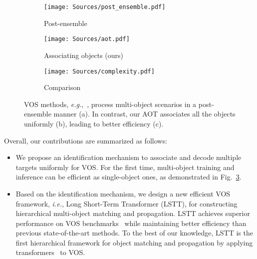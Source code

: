 \documentclass{article}
\def\eg{\emph{e.g.}}
\def\ie{\emph{i.e.}}
\begin{document}
\begin{figure}[t!]
\begin{center}

\begin{subfigure}[b]{.4\textwidth}
			\centering
			\texttt{[image: Sources/post\_ensemble.pdf]}
			\caption{Post-ensemble}\label{fig:post_ensemble}
\end{subfigure}
\begin{subfigure}[b]{.3\textwidth}
			\centering
			\texttt{[image: Sources/aot.pdf]}
			\vspace{-3mm}
			\caption{Associating objects (ours)}\label{fig:aot}
\end{subfigure}
\begin{subfigure}[b]{.28\textwidth}
			\centering
			\texttt{[image: Sources/complexity.pdf]}
			\caption{Comparison}\label{fig:complexity}
\end{subfigure}

\end{center}

\caption{VOS methods, \eg,~\cite{cfbi,KMN}, process multi-object scenarios in a post-ensemble manner (a). In contrast, our AOT associates all the objects uniformly (b), leading to better efficiency (c).} \label{fig:better}
\end{figure} 
Overall, our contributions are summarized as follows: 
\begin{itemize}
\vspace{-0.5em}
\item  We propose an identification mechanism to associate and decode multiple targets uniformly for VOS. For the first time, multi-object training and inference can be efficient as single-object ones, as demonstrated in Fig.~\ref{fig:complexity}.
\vspace{-0.5em}
\item  Based on the identification mechanism, we design a new efficient VOS framework, \ie, Long Short-Term Transformer (LSTT), for constructing hierarchical multi-object matching and propagation. LSTT achieves superior performance on VOS benchmarks~\cite{youtubevos,davis2017,davis2016} while maintaining better efficiency than previous state-of-the-art methods. {To the best of our knowledge, LSTT is the first hierarchical framework for object matching and propagation by applying transformers~\cite{transformer} to VOS.}

\end{itemize}
\end{document}
